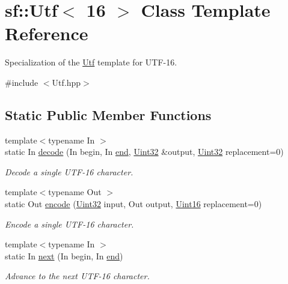 \hypertarget{classsf_1_1_utf_3_0116_01_4}{\section{sf\-:\-:Utf$<$ 16 $>$ Class Template Reference}
\label{classsf_1_1_utf_3_0116_01_4}
}


Specialization of the \hyperlink{classsf_1_1_utf}{Utf} template for U\-T\-F-\/16.  




{\ttfamily \#include $<$Utf.\-hpp$>$}

\subsection*{Static Public Member Functions}
\begin{DoxyCompactItemize}
\item 
{\footnotesize template$<$typename In $>$ }\\static In \hyperlink{classsf_1_1_utf_3_0116_01_4_a17be6fc08e51182e7ac8bf9269dfae37}{decode} (In begin, In \hyperlink{gl3_8h_a432111147038972f06e049e18a837002}{end}, \hyperlink{namespacesf_aa746fb1ddef4410bddf198ebb27e727c}{Uint32} \&output, \hyperlink{namespacesf_aa746fb1ddef4410bddf198ebb27e727c}{Uint32} replacement=0)
\begin{DoxyCompactList}\small\item\em Decode a single U\-T\-F-\/16 character. \end{DoxyCompactList}\item 
{\footnotesize template$<$typename Out $>$ }\\static Out \hyperlink{classsf_1_1_utf_3_0116_01_4_a516090c84ceec2cfde0a13b6148363bb}{encode} (\hyperlink{namespacesf_aa746fb1ddef4410bddf198ebb27e727c}{Uint32} input, Out output, \hyperlink{namespacesf_a2fcaf787248b0b83dfb6b145ca348246}{Uint16} replacement=0)
\begin{DoxyCompactList}\small\item\em Encode a single U\-T\-F-\/16 character. \end{DoxyCompactList}\item 
{\footnotesize template$<$typename In $>$ }\\static In \hyperlink{classsf_1_1_utf_3_0116_01_4_ab899108d77ce088eb001588e84d91525}{next} (In begin, In \hyperlink{gl3_8h_a432111147038972f06e049e18a837002}{end})
\begin{DoxyCompactList}\small\item\em Advance to the next U\-T\-F-\/16 character. \end{DoxyCompactList}\item 

\end{DoxyCompactItemize}
